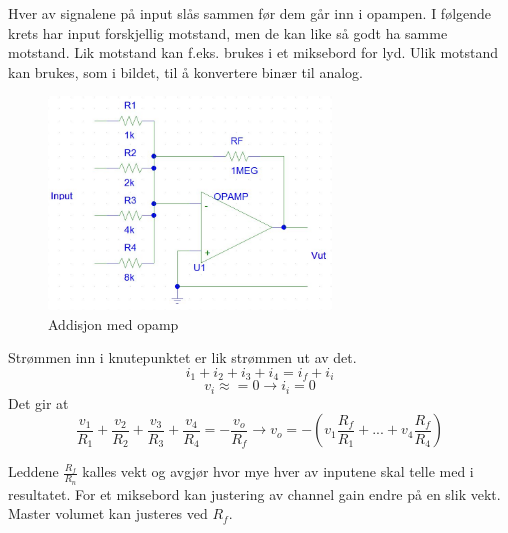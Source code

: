 Hver av signalene på input slås sammen før dem går inn i opampen.
I følgende krets har input forskjellig motstand, men de kan like så godt
ha samme motstand.
Lik motstand kan f.eks. brukes i et miksebord for lyd.
Ulik motstand kan brukes, som i bildet, til å konvertere binær til analog.

\begin{figure}[H]
  \caption{Addisjon med opamp}
  \centering
  \includegraphics[width=0.67\textwidth]{./img/addisjon.png}
\end{figure}

Strømmen inn i knutepunktet er lik strømmen ut av det.
$$i_1 + i_2 + i_3 + i_4 = i_f + i_i$$
$$v_i \approx = 0 \rightarrow i_i = 0$$
Det gir at
$$\frac{v_1}{R_1} + \frac{v_2}{R_2} + \frac{v_3}{R_3} + \frac{v_4}{R_4}
  = -\frac{v_o}{R_f} \rightarrow v_o
  = -\left( v_1\frac{R_f}{R_1} +...+ v_4\frac{R_f}{R_4} \right)$$

Leddene $\frac{R_f}{R_n}$ kalles vekt og avgjør hvor mye hver av inputene skal
telle med i resultatet.
For et miksebord kan justering av channel gain endre på en slik vekt.
Master volumet kan justeres ved $R_f$.
